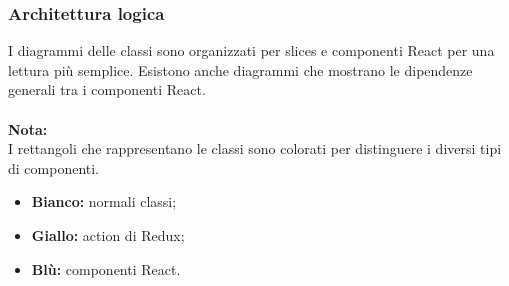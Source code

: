 \subsubsection{Architettura logica}
I diagrammi delle classi sono organizzati per slices e componenti React per una lettura più semplice. 
Esistono anche diagrammi che mostrano le dipendenze generali tra i componenti React.\\\\
\textbf{Nota:}\\
I rettangoli che rappresentano le classi sono colorati per distinguere i diversi tipi di componenti.
\begin{itemize}
    \item \textbf{Bianco:} normali classi;
    \item \textbf{Giallo:} action di Redux;
    \item \textbf{Blù:} componenti React.
\end{itemize}

